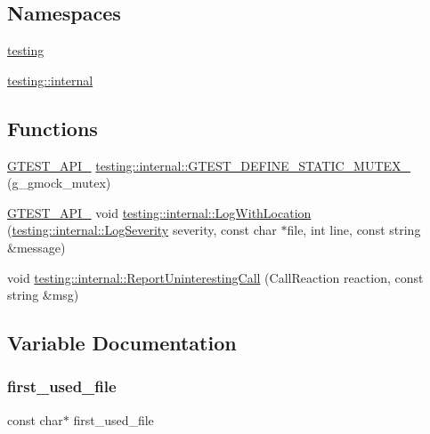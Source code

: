 \subsection*{Namespaces}
\begin{DoxyCompactItemize}
\item 
 \hyperlink{namespacetesting}{testing}
\item 
 \hyperlink{namespacetesting_1_1internal}{testing\+::internal}
\end{DoxyCompactItemize}
\subsection*{Functions}
\begin{DoxyCompactItemize}
\item 
\hyperlink{gtest-port_8h_aa73be6f0ba4a7456180a94904ce17790}{G\+T\+E\+S\+T\+\_\+\+A\+P\+I\+\_\+} \hyperlink{namespacetesting_1_1internal_a8c4aa7be8daa7b60e293071d70a89584}{testing\+::internal\+::\+G\+T\+E\+S\+T\+\_\+\+D\+E\+F\+I\+N\+E\+\_\+\+S\+T\+A\+T\+I\+C\+\_\+\+M\+U\+T\+E\+X\+\_\+} (g\+\_\+gmock\+\_\+mutex)
\item 
\hyperlink{gtest-port_8h_aa73be6f0ba4a7456180a94904ce17790}{G\+T\+E\+S\+T\+\_\+\+A\+P\+I\+\_\+} void \hyperlink{namespacetesting_1_1internal_af271cd1fc0b62a7f4736cb3109e86a37}{testing\+::internal\+::\+Log\+With\+Location} (\hyperlink{namespacetesting_1_1internal_a203d1a8a2147a53d12bbdae40d443914}{testing\+::internal\+::\+Log\+Severity} severity, const char $\ast$file, int line, const string \&message)
\item 
void \hyperlink{namespacetesting_1_1internal_a8d99a1e87d0cea563b2bfad8a4e65276}{testing\+::internal\+::\+Report\+Uninteresting\+Call} (Call\+Reaction reaction, const string \&msg)
\end{DoxyCompactItemize}


\subsection{Variable Documentation}
\mbox{\label{gmock-spec-builders_8cc_a8eedfa563d9488da77e2972262a6adda}} 
\subsubsection{\texorpdfstring{first\+\_\+used\+\_\+file}{first\_used\_file}}
{\footnotesize\ttfamily const char$\ast$ first\+\_\+used\+\_\+file}

